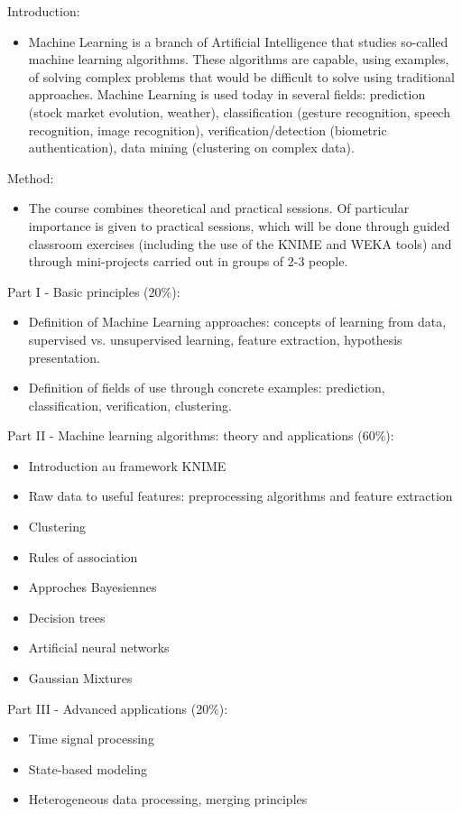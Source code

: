 Introduction:
\begin{itemize}
    \item Machine Learning is a branch of Artificial Intelligence that studies so-called machine learning algorithms. These algorithms are capable, using examples, of solving complex problems that would be difficult to solve using traditional approaches. Machine Learning is used today in several fields: prediction (stock market evolution, weather), classification (gesture recognition, speech recognition, image recognition), verification/detection (biometric authentication), data mining (clustering on complex data).
\end{itemize}
Method:
\begin{itemize}
    \item The course combines theoretical and practical sessions. Of particular importance is given to practical sessions, which will be done through guided classroom exercises (including the use of the KNIME and WEKA tools) and through mini-projects carried out in groups of 2-3 people.
\end{itemize}
Part I - Basic principles (20\%):
\begin{itemize}
    \item Definition of Machine Learning approaches: concepts of learning from data, supervised vs. unsupervised learning, feature extraction, hypothesis presentation.
    \item Definition of fields of use through concrete examples: prediction, classification, verification, clustering.
\end{itemize}
Part II - Machine learning algorithms: theory and applications (60\%):
\begin{itemize}
    \item Introduction au framework KNIME
    \item Raw data to useful features: preprocessing algorithms and feature extraction
    \item Clustering
    \item Rules of association
    \item Approches Bayesiennes
    \item Decision trees
    \item Artificial neural networks
    \item Gaussian Mixtures
\end{itemize}
Part III - Advanced applications (20\%):
\begin{itemize}
    \item Time signal processing
    \item State-based modeling
    \item Heterogeneous data processing, merging principles
\end{itemize}
